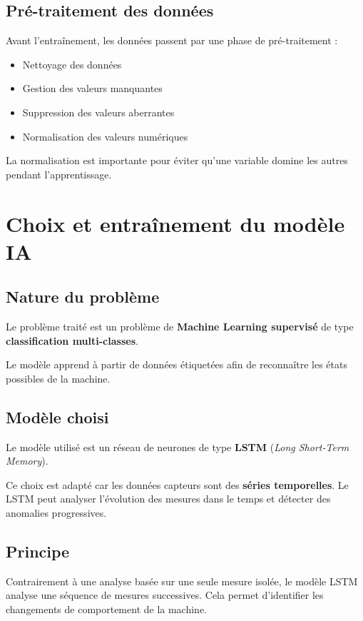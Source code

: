 \documentclass[a4paper,12pt]{article}
\begin{document}
\subsection{Pré-traitement des données}

Avant l’entraînement, les données passent par une phase de pré-traitement :
\begin{itemize}
\item Nettoyage des données
\item Gestion des valeurs manquantes
\item Suppression des valeurs aberrantes
\item Normalisation des valeurs numériques
\end{itemize}

La normalisation est importante pour éviter qu’une variable domine les autres pendant l’apprentissage.

\section{Choix et entraînement du modèle IA}

\subsection{Nature du problème}

Le problème traité est un problème de \textbf{Machine Learning supervisé} de type \textbf{classification multi-classes}.

Le modèle apprend à partir de données étiquetées afin de reconnaître les états possibles de la machine.

\subsection{Modèle choisi}

Le modèle utilisé est un réseau de neurones de type \textbf{LSTM} (\textit{Long Short-Term Memory}).

Ce choix est adapté car les données capteurs sont des \textbf{séries temporelles}. Le LSTM peut analyser l’évolution des mesures dans le temps et détecter des anomalies progressives.

\subsection{Principe}

Contrairement à une analyse basée sur une seule mesure isolée, le modèle LSTM analyse une séquence de mesures successives. Cela permet d’identifier les changements de comportement de la machine.
\end{document}
